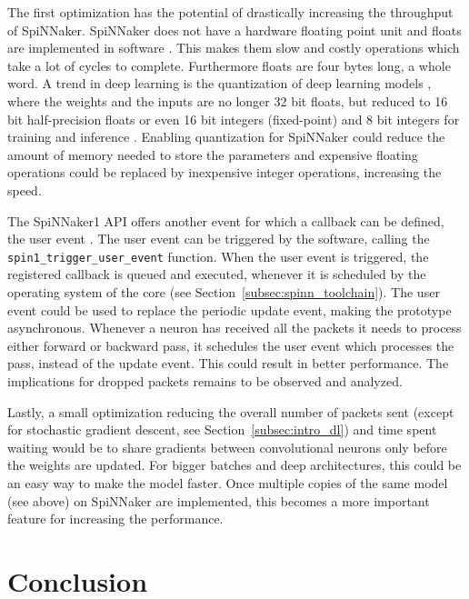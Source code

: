 \documentclass[]{article}
\begin{document}
The first optimization has the potential of drastically increasing
the throughput of SpiNNaker.
SpiNNaker does not have a hardware floating point unit and floats are
implemented in software \citep{furber_et_al_2020}.
This makes them slow and costly operations which take a lot of cycles
to complete.
Furthermore floats are four bytes long, a whole word.
A trend in deep learning is the quantization of deep learning models
\citep{praveen_2020}, where the weights and the inputs are no longer
32 bit floats, but reduced to 16 bit half-precision floats or even
16 bit integers (fixed-point) and 8 bit integers for training and
inference \citep{das_et_al_2018}.
Enabling quantization for SpiNNaker could reduce the amount of memory
needed to store the parameters and expensive floating operations
could be replaced by inexpensive integer operations, increasing the
speed.

The SpiNNaker1 API offers another event for which a callback can
be defined, the user event \citep{furber_et_al_2020}.
The user event can be triggered by the software, calling the
\texttt{spin1\_\-trigger\_user\_event} function.
When the user event is triggered, the registered callback is queued
and executed, whenever it is scheduled by the operating system of the
core (see Section~\ref{subsec:spinn_toolchain}).
The user event could be used to replace the periodic update event,
making the prototype asynchronous.
Whenever a neuron has received all the packets it needs to process
either forward or backward pass, it schedules the user event which
processes the pass, instead of the update event.
This could result in better performance.
The implications for dropped packets remains to be observed and
analyzed.

Lastly, a small optimization reducing the overall number of packets
sent (except for stochastic gradient descent, see
Section~\ref{subsec:intro_dl}) and time spent waiting would be to
share gradients between convolutional neurons only before the weights
are updated.
For bigger batches and deep architectures, this could be an easy way
to make the model faster.
Once multiple copies of the same model (see above) on SpiNNaker are
implemented, this becomes a more important feature for increasing the
performance.



\section{Conclusion} %
\label{sec:conclusion}
\end{document}
